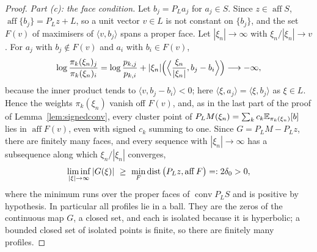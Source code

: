 \documentclass{article} %
\theoremstyle{plain}
\theoremstyle{definition}
\theoremstyle{remark}
\begin{document}
\begin{proof}
\emph{Part (c): the face condition.} Let $b_j=P_La_j$ for $a_j\in S$. Since
$z\in\operatorname{aff}S$, $\operatorname{aff}\{b_j\}=P_Lz+L$, so a unit vector $v\in L$ is not
constant on $\{b_j\}$, and the set $F(v)$ of maximisers of $\langle v,b_j\rangle$ spans a proper
face. Let $|\xi_n|\to\infty$ with $\xi_n/|\xi_n|\to v$. For $a_j$ with $b_j\notin F(v)$ and $a_i$
with $b_i\in F(v)$,
\[
\log\frac{\pi_k(\xi_n)_j}{\pi_k(\xi_n)_i}=\log\frac{p_{k,j}}{p_{k,i}}
+|\xi_n|\Bigl(\Bigl\langle\frac{\xi_n}{|\xi_n|},b_j-b_i\Bigr\rangle\Bigr)\longrightarrow-\infty,
\]
because the inner product tends to $\langle v,b_j-b_i\rangle<0$; here $\langle\xi,a_j\rangle=
\langle\xi,b_j\rangle$ as $\xi\in L$. Hence the weights $\pi_k(\xi_n)$ vanish off $F(v)$, and, as
in the last part of the proof of Lemma~\ref{lem:signedconv}, every cluster point of
$P_LM(\xi_n)=\sum_kc_k\mathbb{E}_{\pi_k(\xi_n)}[b]$ lies in $\operatorname{aff}F(v)$, even with signed $c_k$
summing to one. Since $G=P_LM-P_Lz$, there are finitely many faces, and every sequence with
$|\xi_n|\to\infty$ has a subsequence along which $\xi_n/|\xi_n|$ converges,
\begin{equation}
\liminf_{|\xi|\to\infty}|G(\xi)|\ \ge\ \min_F\dist\big(P_Lz,\operatorname{aff}F\big)=:2\delta_0>0 ,
\label{eq:pf:spec:escape}
\end{equation}
where the minimum runs over the proper faces of $\operatorname{conv}P_LS$ and is positive by
hypothesis. In particular all profiles lie in a ball. They are the zeros of the continuous map
$G$, a closed set, and each is isolated because it is hyperbolic; a bounded closed set of isolated
points is finite, so there are finitely many profiles.


\end{proof}
\end{document}
